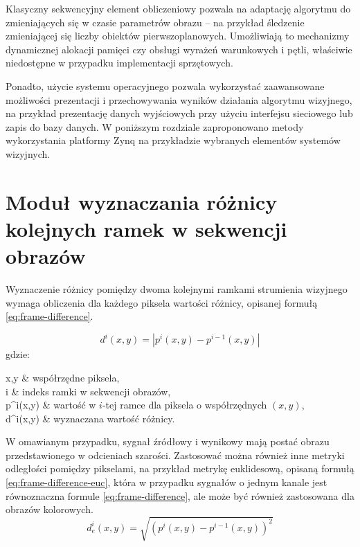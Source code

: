 Klasyczny sekwencyjny element obliczeniowy pozwala na adaptację algorytmu do zmieniających się w czasie parametrów obrazu -- na przykład śledzenie zmieniającej się liczby obiektów pierwszoplanowych. 
Umożliwiają to mechanizmy dynamicznej alokacji pamięci czy obsługi wyrażeń warunkowych i pętli, właściwie niedostępne w przypadku implementacji sprzętowych.

Ponadto, użycie systemu operacyjnego pozwala wykorzystać zaawansowane możliwości prezentacji i przechowywania wyników działania algorytmu wizyjnego, na przykład prezentację danych wyjściowych przy użyciu interfejsu sieciowego lub zapis do bazy danych.
W poniższym rozdziale zaproponowano metody wykorzystania platformy Zynq na przykładzie wybranych elementów systemów wizyjnych.


\section{Moduł wyznaczania różnicy kolejnych ramek w sekwencji obrazów}

Wyznaczenie różnicy pomiędzy dwoma kolejnymi ramkami strumienia wizyjnego wymaga obliczenia dla każdego piksela wartości różnicy, opisanej formułą \eqref{eq:frame-difference}.

\begin{equation}
\label{eq:frame-difference}
d^i(x,y) = | p^i(x,y) - p^{i-1}(x,y) |
\end{equation}
gdzie:
\begin{conditions}
	x,y & współrzędne piksela, \\
	i & indeks ramki w sekwencji obrazów, \\
	p^i(x,y) & wartość w $i$-tej ramce dla piksela o współrzędnych $(x,y)$, \\
	d^i(x,y) & wyznaczana wartość różnicy. \\
\end{conditions}

W omawianym przypadku, sygnał źródłowy i wynikowy mają postać obrazu przedstawionego w odcieniach szarości. 
Zastosować można również inne metryki odległości pomiędzy pikselami, na przykład metrykę euklidesową, opisaną formułą \eqref{eq:frame-difference-euc}, która w przypadku sygnałów o jednym kanale jest równoznaczna formule \eqref{eq:frame-difference}, ale może być również zastosowana dla obrazów kolorowych.
\begin{equation}
\label{eq:frame-difference-euc}
d_e^i(x,y) = \sqrt{(p^i(x,y) - p^{i-1}(x,y))^2}
\end{equation}

